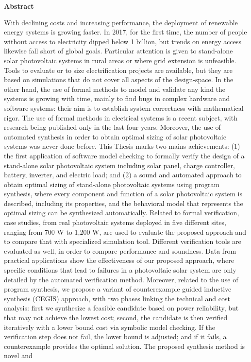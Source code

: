 \thispagestyle{plain}
\begin{center}
%    
%    
%    
    \vspace{0.9cm}
    \textbf{Abstract}
\end{center}
With declining costs and increasing performance, the deployment of renewable energy systems is growing faster. In 2017, for the first time, the number of people without access to electricity dipped below 1 billion, but trends on energy access likewise fall short of global goals. Particular attention is given to stand-alone solar photovoltaic systems in rural areas or where grid extension is unfeasible. Tools to evaluate or to size electrification projects are available, but they are based on simulations that do not cover all aspects of the design-space. In the other hand, the use of formal methods to model and validate any kind the systems is growing with time, mainly to find bugs in complex hardware and software systems: their aim is to establish system correctness with mathematical rigor. The use of formal methods in electrical systems is a recent subject, with research being published only in the last four years. Moreover, the use of automated synthesis in order to obtain optimal sizing of solar photovoltaic systems was never done before. This Thesis marks two mains achievements: (1) the first application of software model checking to formally verify the design of a stand-alone solar photovoltaic system including solar panel, charge controller, battery, inverter, and electric load; and (2) a sound and automated approach to obtain optimal sizing of stand-alone photovoltaic systems using program synthesis, where every component and function of a solar photovoltaic system is described, including its properties, and the behavioral model that represents the optimal sizing can be synthesized automatically. Related to formal verification, case studies, from real photovoltaic systems deployed in five different sites, ranging from 700 W to 1,200 W, are used to evaluate the proposed approach and to compare that with specialized simulation tool. Different verification tools are evaluated as well, in order to compare performance and soundness. Data from practical applications show the effectiveness of our proposed approach, where specific conditions that lead to failures in a photovoltaic solar system are only detailed by the automated verification method. Moreover, related to the use of program synthesis, we propose a variant of counterexample guided inductive synthesis (CEGIS) approach, with two phases linking the technical and cost analysis: first we synthesize a feasible candidate based on power reliability, but that may not achieve the lowest cost; second, the candidate is then verified iteratively with a lower bound cost via symbolic model checking. If the verification step does not fail, the lower bound is adjusted; and if it fails, a counterexample provides the optimal solution. The proposed synthesis method is novel and 